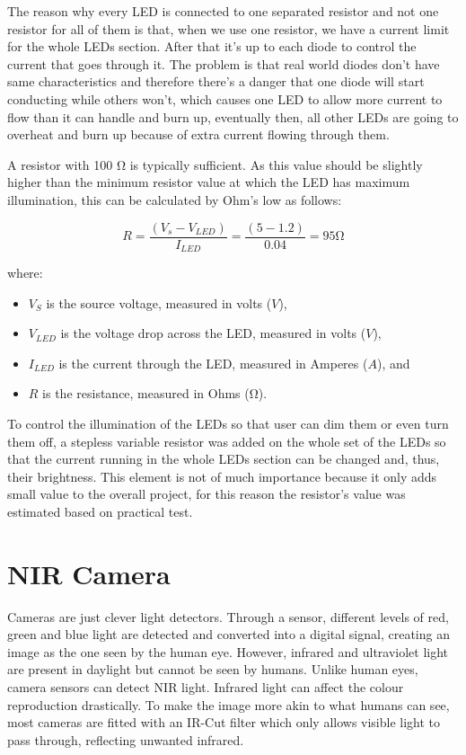 The reason why every LED is connected to one separated resistor and not one resistor for all of them is that, when we use one resistor, we have a current limit for the whole LEDs section. After that it's up to each diode to control the current that goes through it. The problem is that real world diodes don't have same characteristics and therefore there's a danger that one diode will start conducting while others won't, which causes one LED to allow more current to flow than it can handle and burn up, eventually then, all other LEDs are going to overheat and burn up because of extra current flowing through them.

A resistor with 100 \si{\ohm} is typically sufficient. As this value should be slightly higher than the minimum resistor value at which the LED has maximum illumination, this can be calculated by Ohm’s low as follows:


\begin{equation}
R= \frac {(V_s - V_{LED})}{I_{LED}} =  \frac {(5-1.2)}{0.04}=95   \si{\ohm}
\end{equation}


where:
\begin{itemize}
  \item $V_S$ is the source voltage, measured in volts ($V$),
  \item $V_{LED}$ is the voltage drop across the LED, measured in volts ($V$),
  \item $I_{LED}$ is the current through the LED, measured in Amperes ($A$), and
  \item $R$ is the resistance, measured in Ohms (\si{\ohm}).
\end{itemize}


To control the illumination of the LEDs so that user can dim them or even turn them off, a stepless variable resistor was added on the whole set of the LEDs so that the current running in the whole LEDs section can be changed and, thus, their brightness. This element is not of much importance because it only adds small value to the overall project, for this reason the resistor's value was estimated based on practical test.


\section{NIR Camera}

Cameras are just clever light detectors. Through a sensor, different levels of red, green and blue light are detected and converted into a digital signal, creating an image as the one seen by the human eye. However, infrared and ultraviolet light are present in daylight but cannot be seen by humans. Unlike human eyes, camera sensors can detect NIR light. Infrared light can affect the colour reproduction drastically. To make the image more akin to what humans can see, most cameras are fitted with an IR-Cut filter which only allows visible light to pass through, reflecting unwanted infrared. 

